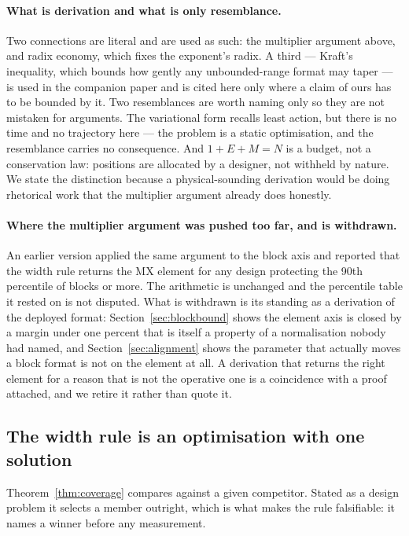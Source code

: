 \documentclass[11pt]{article}
\theoremstyle{definition}
\begin{document}
\paragraph{What is derivation and what is only resemblance.} Two connections are
literal and are used as such: the multiplier argument above, and radix economy,
which fixes the exponent's radix. A third --- Kraft's inequality, which bounds
how gently any unbounded-range format may taper --- is used in the companion
paper and is cited here only where a claim of ours has to be bounded by it. Two
resemblances are worth naming only so they are not mistaken for arguments. The
variational form recalls least action, but there is no time and no trajectory
here --- the problem is a static optimisation, and the resemblance carries no
consequence. And $1+E+M=N$ is a budget, not a conservation law: positions are
allocated by a designer, not withheld by nature. We state the distinction because
a physical-sounding derivation would be doing rhetorical work that the multiplier
argument already does honestly.

\paragraph{Where the multiplier argument was pushed too far, and is withdrawn.}
An earlier version applied the same argument to the block axis and reported that
the width rule returns the MX element for any design protecting the 90th
percentile of blocks or more. The arithmetic is unchanged and the percentile
table it rested on is not disputed. What is withdrawn is its standing as a
derivation of the deployed format: Section~\ref{sec:blockbound} shows the element
axis is closed by a margin under one percent that is itself a property of a
normalisation nobody had named, and Section~\ref{sec:alignment} shows the
parameter that actually moves a block format is not on the element at all. A
derivation that returns the right element for a reason that is not the operative
one is a coincidence with a proof attached, and we retire it rather than quote
it.

\subsection{The width rule is an optimisation with one solution}
\label{sec:widthrule}

Theorem~\ref{thm:coverage} compares against a given competitor. Stated as a
design problem it selects a member outright, which is what makes the rule
falsifiable: it names a winner before any measurement.
\end{document}

